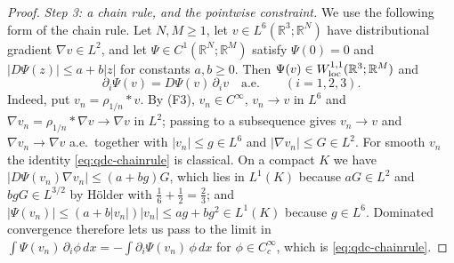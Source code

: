 \documentclass[11pt]{article}
\theoremstyle{definition}
\theoremstyle{plain}
\newcommand{\R}{\mathbb R}
\begin{document}
\begin{proof}
\emph{Step 3: a chain rule, and the pointwise constraint.}  We use the
following form of the chain rule.  Let $N,M\ge1$, let
$v\in L^6(\R^3;\R^N)$ have distributional gradient $\nabla v\in L^2$, and let
$\Psi\in C^1(\R^N;\R^M)$ satisfy $\Psi(0)=0$ and $|D\Psi(z)|\le a+b|z|$ for
constants $a,b\ge0$.  Then $\Psi(v)\in W^{1,1}_{\rm loc}(\R^3;\R^M)$ and
\begin{equation}\label{eq:qdc-chainrule}
 \partial_i\Psi(v)=D\Psi(v)\,\partial_iv\quad\text{a.e.}\qquad(i=1,2,3).
\end{equation}
Indeed, put $v_n=\rho_{1/n}*v$.  By (F3), $v_n\in C^\infty$, $v_n\to v$ in
$L^6$ and $\nabla v_n=\rho_{1/n}*\nabla v\to\nabla v$ in $L^2$; passing to a
subsequence \cite[Thm.~4.9, p.~94]{Brezis2011} gives $v_n\to v$ and
$\nabla v_n\to\nabla v$ a.e.\ together with $|v_n|\le g\in L^6$ and
$|\nabla v_n|\le G\in L^2$.  For smooth $v_n$ the identity
\eqref{eq:qdc-chainrule} is classical.  On a compact $K$ we have
$|D\Psi(v_n)\nabla v_n|\le(a+bg)G$, which lies in $L^1(K)$ because
$aG\in L^2$ and $bgG\in L^{3/2}$ by H\"older with $\frac16+\frac12=\frac23$;
and $|\Psi(v_n)|\le(a+b|v_n|)|v_n|\le ag+bg^2\in L^1(K)$ because $g\in L^6$.
Dominated convergence therefore lets us pass to the limit in
$\int\Psi(v_n)\,\partial_i\phi\,dx=-\int\partial_i\Psi(v_n)\,\phi\,dx$ for
$\phi\in C_c^\infty$, which is \eqref{eq:qdc-chainrule}.


\end{proof}
\end{document}
